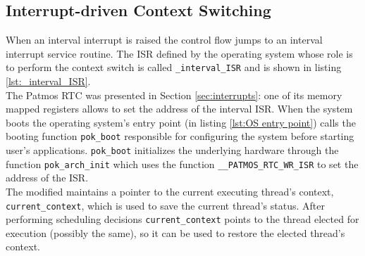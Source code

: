 \subsection{Interrupt-driven Context Switching}
When an interval interrupt is raised the control flow jumps to an interval interrupt service routine. The ISR defined by the operating system whose role is to perform the context switch is called \texttt{\_interval\_ISR} and is shown in listing \ref{lst:_interval_ISR}.\\ The Patmos RTC was presented in Section \ref{sec:interrupts}: one of its memory mapped registers allows to set the address of the interval ISR. When the system boots the operating system's entry point (in listing \ref{lst:OS entry point}) calls the booting function \texttt{pok\_boot} responsible for configuring the system before starting user's applications. \texttt{pok\_boot} initializes the underlying hardware through the function \texttt{pok\_arch\_init} which uses the function \texttt{\_\_PATMOS\_RTC\_WR\_ISR} to set the address of the ISR.\\

The modified \os maintains a pointer to the current executing thread's context, \texttt{current\_context}, which is used to save the current thread's status. After performing scheduling decisions \texttt{current\_context} points to the thread elected for execution (possibly the same), so it can be used to restore the elected thread's context.

